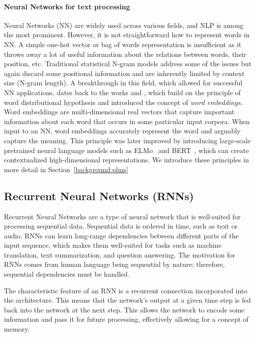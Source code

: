 \paragraph{Neural Networks for text processing}
Neural Networks (NN) are widely used across various fields, and NLP is among the most prominent.
However, it is not straightforward how to represent words in NN.
A simple one-hot vector or bag of words representation is insufficient as it throws away a lot of useful information about the relations between words, their position, etc.
Traditional statistical N-gram models \cite{jurafsky2000speech} address some of the issues but again discard some positional information and are inherently limited by context size (N-gram length).
A breakthrough in this field, which allowed for successful NN applications, dates back to the works \citep{mikolov2010recurrent} and \citep{mikolov2013distributed}, which build on the principle of word distributional hypothesis and introduced the concept of \emph{word embeddings}.
Word embeddings are multi-dimensional real vectors that capture important information about each word that occurs in some particular input corpora.
When input to an NN, word embeddings accurately represent the word and arguably capture the meaning.
This principle was later improved by introducing large-scale pretrained neural language models such as ELMo~\cite{peters-etal-2018-deep} and BERT~\cite{devlin2019}, which can create contextualized high-dimensional representations.
We introduce these principles in more detail in Section~\ref{background:plms}

\subsection{Recurrent Neural Networks (RNNs)}
\label{background:rnns}
Recurrent Neural Networks are a type of neural network that is well-suited for processing sequential data\cite{GoodBengCour16}. Sequential data is ordered in time, such as text or audio.
RNNs can learn long-range dependencies between different parts of the input sequence, which makes them well-suited for tasks such as machine translation, text summarization, and question answering.
The motivation for RNNs comes from human language being sequential by nature; therefore, sequential dependencies must be handled.

The characteristic feature of an RNN is a recurrent connection incorporated into the architecture.
This means that the network's output at a given time step is fed back into the network at the next step. This allows the network to encode some information and pass it for future processing, effectively allowing for a concept of memory.

